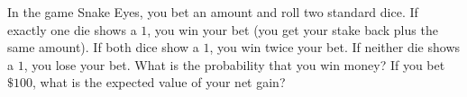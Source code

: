 In the game Snake Eyes, you bet an amount and roll two standard dice. If exactly one die shows a $1$, you win your bet (you get your stake back plus the same amount). If both dice show a $1$, you win twice your bet. If neither die shows a $1$, you lose your bet. What is the probability that you win money? If you bet $\$100$, what is the expected value of your net gain?
